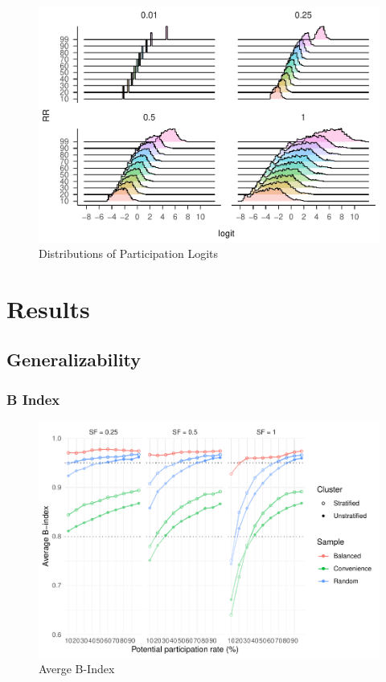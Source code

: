 \documentclass[
  man,floatsintext]{apa6}
\begin{document}
\begin{figure}
\centering
\includegraphics{5---Analysis_files/figure-latex/unnamed-chunk-14-1.pdf}
\caption{\label{fig:unnamed-chunk-14}Distributions of Participation Logits}
\end{figure}

\hypertarget{results}{%
\section{Results}\label{results}}

\hypertarget{generalizability}{%
\subsection{Generalizability}\label{generalizability}}

\hypertarget{b-index}{%
\subsubsection{B Index}\label{b-index}}

\begin{figure}
\centering
\includegraphics{5---Analysis_files/figure-latex/unnamed-chunk-16-1.pdf}
\caption{\label{fig:unnamed-chunk-16}Averge B-Index}
\end{figure}
\end{document}
